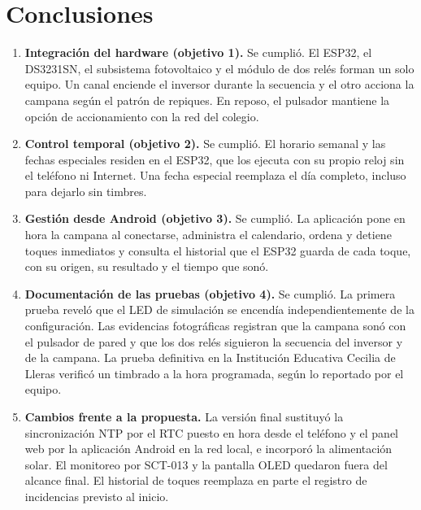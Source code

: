 \documentclass[a4paper,11pt]{article}
\begin{document}
\section{Conclusiones}
\begin{enumerate}
  \item \textbf{Integración del hardware (objetivo 1).} Se cumplió. El ESP32, el DS3231SN, el subsistema fotovoltaico y el módulo de dos relés forman un solo equipo. Un canal enciende el inversor durante la secuencia y el otro acciona la campana según el patrón de repiques. En reposo, el pulsador mantiene la opción de accionamiento con la red del colegio.
  \item \textbf{Control temporal (objetivo 2).} Se cumplió. El horario semanal y las fechas especiales residen en el ESP32, que los ejecuta con su propio reloj sin el teléfono ni Internet. Una fecha especial reemplaza el día completo, incluso para dejarlo sin timbres.
  \item \textbf{Gestión desde Android (objetivo 3).} Se cumplió. La aplicación pone en hora la campana al conectarse, administra el calendario, ordena y detiene toques inmediatos y consulta el historial que el ESP32 guarda de cada toque, con su origen, su resultado y el tiempo que sonó.
  \item \textbf{Documentación de las pruebas (objetivo 4).} Se cumplió. La primera prueba reveló que el LED de simulación se encendía independientemente de la configuración. Las evidencias fotográficas registran que la campana sonó con el pulsador de pared y que los dos relés siguieron la secuencia del inversor y de la campana. La prueba definitiva en la Institución Educativa Cecilia de Lleras verificó un timbrado a la hora programada, según lo reportado por el equipo.
  \item \textbf{Cambios frente a la propuesta.} La versión final sustituyó la sincronización NTP por el RTC puesto en hora desde el teléfono y el panel web por la aplicación Android en la red local, e incorporó la alimentación solar. El monitoreo por SCT-013 y la pantalla OLED quedaron fuera del alcance final. El historial de toques reemplaza en parte el registro de incidencias previsto al inicio.
\end{enumerate}
\end{document}
